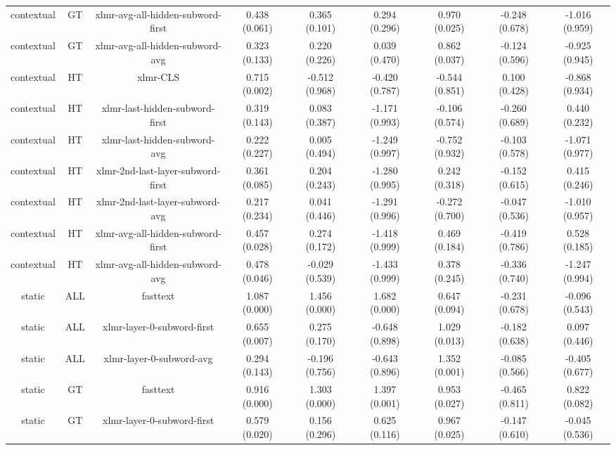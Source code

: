\begin{sidewaystable}[htb]
\begin{tabular}{@{}ccccccccc@{}}
        contextual & GT & xlmr-avg-all-hidden-subword-first & 0.438 (0.061) & 0.365 (0.101) & 0.294 (0.296) & 0.970 (0.025) & -0.248 (0.678) & -1.016 (0.959) \\
        contextual & GT & xlmr-avg-all-hidden-subword-avg & 0.323 (0.133) & 0.220 (0.226) & 0.039 (0.470) & 0.862 (0.037) & -0.124 (0.596) & -0.925 (0.945) \\
        contextual & HT & xlmr-CLS & 0.715 (0.002) & -0.512 (0.968) & -0.420 (0.787) & -0.544 (0.851) & 0.100 (0.428) & -0.868 (0.934) \\
        contextual & HT & xlmr-last-hidden-subword-first & 0.319 (0.143) & 0.083 (0.387) & -1.171 (0.993) & -0.106 (0.574) & -0.260 (0.689) & 0.440 (0.232) \\
        contextual & HT & xlmr-last-hidden-subword-avg & 0.222 (0.227) & 0.005 (0.494) & -1.249 (0.997) & -0.752 (0.932) & -0.103 (0.578) & -1.071 (0.977) \\
        contextual & HT & xlmr-2nd-last-layer-subword-first & 0.361 (0.085) & 0.204 (0.243) & -1.280 (0.995) & 0.242 (0.318) & -0.152 (0.615) & 0.415 (0.246) \\
        contextual & HT & xlmr-2nd-last-layer-subword-avg & 0.217 (0.234) & 0.041 (0.446) & -1.291 (0.996) & -0.272 (0.700) & -0.047 (0.536) & -1.010 (0.957) \\
        contextual & HT & xlmr-avg-all-hidden-subword-first & 0.457 (0.028) & 0.274 (0.172) & -1.418 (0.999) & 0.469 (0.184) & -0.419 (0.786) & 0.528 (0.185) \\
        contextual & HT & xlmr-avg-all-hidden-subword-avg & 0.478 (0.046) & -0.029 (0.539) & -1.433 (0.999) & 0.378 (0.245) & -0.336 (0.740) & -1.247 (0.994) \\
        static & ALL & fasttext & 1.087 (0.000) & 1.456 (0.000) & 1.682 (0.000) & 0.647 (0.094) & -0.231 (0.678) & -0.096 (0.543) \\
        static & ALL & xlmr-layer-0-subword-first & 0.655 (0.007) & 0.275 (0.170) & -0.648 (0.898) & 1.029 (0.013) & -0.182 (0.638) & 0.097 (0.446) \\
        static & ALL & xlmr-layer-0-subword-avg & 0.294 (0.143) & -0.196 (0.756) & -0.643 (0.896) & 1.352 (0.001) & -0.085 (0.566) & -0.405 (0.677) \\
        static & GT & fasttext & 0.916 (0.000) & 1.303 (0.000) & 1.397 (0.001) & 0.953 (0.027) & -0.465 (0.811) & 0.822 (0.082) \\
        static & GT & xlmr-layer-0-subword-first & 0.579 (0.020) & 0.156 (0.296) & 0.625 (0.116) & 0.967 (0.025) & -0.147 (0.610) & -0.045 (0.536) \\

\end{tabular}
\end{sidewaystable}
